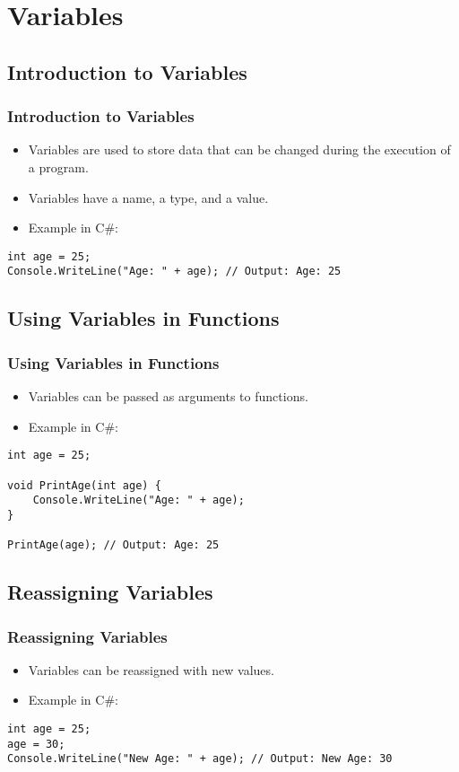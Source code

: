 \section{Variables}

\subsection{Introduction to Variables}
\begin{frame}[fragile]
\frametitle{Introduction to Variables}
\begin{itemize}
    \item Variables are used to store data that can be changed during the execution of a program.
    \item Variables have a name, a type, and a value.
    \item Example in C\#:
\end{itemize}
\begin{lstlisting}
int age = 25;
Console.WriteLine("Age: " + age); // Output: Age: 25
\end{lstlisting}
\end{frame}

\subsection{Using Variables in Functions}
\begin{frame}[fragile]
\frametitle{Using Variables in Functions}
\begin{itemize}
    \item Variables can be passed as arguments to functions.
    \item Example in C\#:
\end{itemize}
\begin{lstlisting}
int age = 25;

void PrintAge(int age) {
    Console.WriteLine("Age: " + age);
}

PrintAge(age); // Output: Age: 25
\end{lstlisting}
\end{frame}

\subsection{Reassigning Variables}
\begin{frame}[fragile]
\frametitle{Reassigning Variables}
\begin{itemize}
    \item Variables can be reassigned with new values.
    \item Example in C\#:
\end{itemize}
\begin{lstlisting}
int age = 25;
age = 30;
Console.WriteLine("New Age: " + age); // Output: New Age: 30
\end{lstlisting}
\end{frame}

